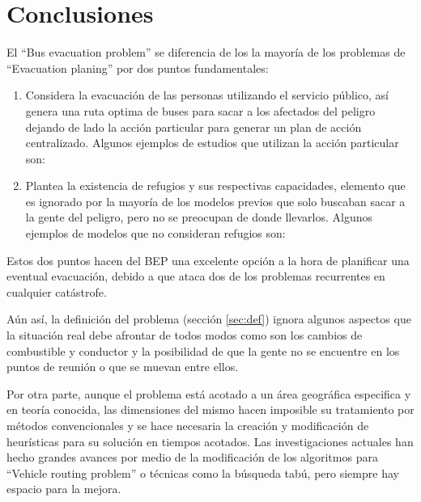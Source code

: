 \documentclass[letter, 10pt]{article}
\begin{document}
\section{Conclusiones}\label{sec:conc}
    El ``Bus evacuation problem'' se diferencia de los la mayoría de los
    problemas de ``Evacuation planing'' por dos puntos fundamentales:
    \begin{enumerate}
        \item 
            Considera la evacuación de las personas utilizando el servicio
            público, así genera una ruta optima de buses para sacar a los
            afectados del peligro dejando de lado la acción particular para
            generar un plan de acción centralizado. Algunos ejemplos de estudios
            que utilizan la acción particular son: 
            \cite{kiefer2006incrementalism} \cite{litman2006lessons}
            \cite{liu2008corridor} \cite{wolshon2002planning}
        \item
            Plantea la existencia de refugios y sus respectivas capacidades,
            elemento que es ignorado por la mayoría de los modelos previos que
            solo buscaban sacar a la gente del peligro, pero no se preocupan de
            donde llevarlos. Algunos ejemplos de modelos que
            no consideran refugios son: \cite{perkins2001modeling}
            \cite{sayyady2007optimizing} \cite{sayyady2010optimizing}
            \cite{tunc2011optimizing}
    \end{enumerate}
    Estos dos puntos hacen del BEP una excelente opción a la hora de planificar
    una eventual evacuación, debido a que ataca dos de los problemas recurrentes
    en cualquier catástrofe.

    Aún así, la definición del problema (sección \ref{sec:def}) ignora algunos
    aspectos que la situación real debe afrontar de todos modos como son los
    cambios de combustible y conductor y la posibilidad de que la gente no se
    encuentre en los puntos de reunión o que se muevan entre ellos.

    Por otra parte, aunque el problema está acotado a un área geográfica 
    especifica y en teoría conocida, las
    dimensiones del mismo hacen imposible su tratamiento por métodos
    convencionales y se hace necesaria la creación y modificación de heurísticas
    para su solución en tiempos acotados. Las investigaciones actuales han hecho
    grandes avances por medio de la modificación de los algoritmos para
    ``Vehicle routing problem'' o técnicas como la búsqueda tabú, pero siempre
    hay espacio para la mejora.
\end{document}
